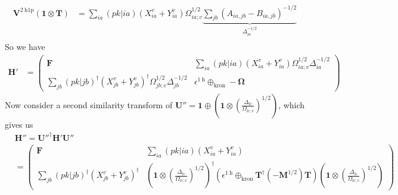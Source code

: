 \begin{align}
    \bm{V}^{2 \mathrm{~h} 1 \mathrm{p}} \left(\bm{1}\otimes\bm{T}\right) &= \sum_{ia} (pk|ia) \left( X_{ia}^{v} + Y_{ia}^{v} \right) \Omega_{ia;v}^{1/2} \underbrace{\sum_{jb} \left(A_{ia,jb} - B_{ia,jb}\right)^{-1/2}}_{\Delta _{ia}^{-1/2}} \\
\end{align}
So we have
\begin{align}
    \bm{H'} &= \begin{pmatrix} \bm{F} & \sum_{ia} (pk|ia) \left( X_{ia}^{v} + Y_{ia}^{v} \right) \Omega_{ia;v}^{1/2} \Delta _{ia}^{-1/2} \\ \sum_{jb} (pk|jb)^\dagger \left( X_{jb}^{v} + Y_{jb}^{v} \right)^\dagger \Omega_{jb;v}^{1/2} \Delta _{jb}^{-1/2} & \epsilon^{1 \mathrm{~h}} \oplus_{\text{kron}} - \boldsymbol{\Omega }\end{pmatrix}
\end{align}
Now consider a second similarity transform of $\bm{U}'' = \bm{1} \oplus \left( \bm{1} \otimes \left(\frac{\Delta _{lc}}{\Omega _{lc;v}}\right)^{1/2} \right)$, which gives us
\begin{align}
    &\bm{H''} = {\bm{U}''}^\dagger \bm{H'} \bm{U}'' \\
    &= \begin{pmatrix}
        \bm{F} & \sum_{ia} (pk|ia) \left( X_{ia}^{v} + Y_{ia}^{v} \right) \\
        \sum_{jb} (pk|jb)^\dagger \left( X_{jb}^{v} + Y_{jb}^{v} \right)^\dagger & 
        \left( \bm{1} \otimes \left( \frac{\Delta_{lc}}{\Omega_{lc;v}} \right)^{1/2} \right)^\dagger
        \left( \epsilon^{1\mathrm{~h}} \oplus_{\text{kron}} \bm{T}^\dagger (-{\bm{M}}^{1/2}) \bm{T} \right)
        \left( \bm{1} \otimes \left( \frac{\Delta_{lc}}{\Omega_{lc;v}} \right)^{1/2} \right)
    \end{pmatrix}
\end{align}

